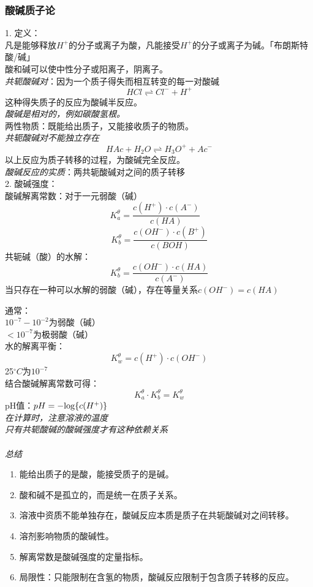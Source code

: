 \documentclass[utf8,a4paper,12pt]{ctexart}
\begin{document}
\subsubsection{酸碱质子论}
{\large 1. 定义：}\\
凡是能够释放$H^{+}$的分子或离子为酸，凡能接受$H^{+}$的分子或离子为碱。「布朗斯特酸/碱」\\
酸和碱可以使中性分子或阳离子，阴离子。\\
\emph{共轭酸碱对}：因为一个质子得失而相互转变的每一对酸碱
\[
HCl \rightleftharpoons Cl^{-} + H^{+}
\]
这种得失质子的反应为酸碱半反应。\\
\emph{酸碱是相对的，例如碳酸氢根。}\\
两性物质：既能给出质子，又能接收质子的物质。\\
\emph{共轭酸碱对不能独立存在}
\[
HAc + H_{2}O \rightleftharpoons H_{3}O^{+} + Ac^{-}
\]
以上反应为质子转移的过程，为酸碱完全反应。\\
\emph{酸碱反应的实质}：两共轭酸碱对之间的质子转移\\
{\large 2. 酸碱强度：}\\
酸碱解离常数：对于一元弱酸（碱）
\begin{equation}
K^{\theta}_{a} = \frac{c(H^{+})\cdot c(A^{-})}{c(HA)}\quad
\end{equation}
\[
K^{\theta}_{b} = \frac{c(OH^{-})\cdot c(B^{+})}{c(BOH)}
\]
共轭碱（酸）的水解：
\[
K^{\theta}_{b} = \frac{c(OH^{-})\cdot c(HA)}{c(A^{-})}
\]
当只存在一种可以水解的弱酸（碱），存在等量关系$c(OH^{-}) = c(HA)$

通常：\\
$10^{-7} - 10^{-2}$为弱酸（碱）\\
$<10^{-7}$为极弱酸（碱）\\
水的解离平衡：
\begin{equation}
K^{\theta}_{w} = c(H^{+})\cdot c(OH^{-})
\end{equation}
25$^{\circ}C$为$10^{-7}$\\
结合酸碱解离常数可得：
\begin{equation}
K^{\theta}_{a} \cdot K^{\theta}_{b} = K^{\theta}_{w}
\end{equation}
pH值：$pH = -{\rm log}\{c(H^{+})\}$\\
\emph{在计算时，注意溶液的温度\\只有共轭酸碱的酸碱强度才有这种依赖关系}\\\\
\emph{总结}
\begin{enumerate}[1)]
\item 能给出质子的是酸，能接受质子的是碱。
\item 酸和碱不是孤立的，而是统一在质子关系。
\item 溶液中资质不能单独存在，酸碱反应本质是质子在共轭酸碱对之间转移。
\item 溶剂影响物质的酸碱性。
\item 解离常数是酸碱强度的定量指标。
\item 局限性：只能限制在含氢的物质，酸碱反应限制于包含质子转移的反应。
\end{enumerate}
\end{document}
